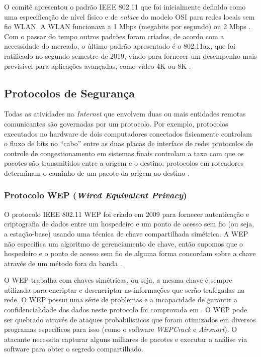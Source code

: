 \documentclass[
	article,			%
	11pt,				%
	oneside,			%
	a4paper,			%
	english,			%
	brazil,				%
	sumario=tradicional
	]{abntex2}
\begin{document}
O comitê apresentou o padrão IEEE 802.11 que foi inicialmente definido como uma especificação de nível físico e de \textit{enlace} do modelo OSI para redes locais sem fio WLAN. A WLAN  funcionava a 1 Mbps (megabits por segundo) ou 2 Mbps \cite{tanenbaum2003redes}. Com o passar do tempo outros padrões foram criados, de acordo com a necessidade do mercado, o último padrão apresentado é o 802.11ax, que foi ratificado no segundo semestre de 2019, vindo para fornecer um desempenho mais previsível para aplicações avançadas, como vídeo 4K ou 8K \cite{lopez2019ieee}. 

\subsection{Protocolos de Segurança}
\label{sec:protocolo}
Todas as atividades na \textit{Internet} que envolvem duas ou mais entidades remotas comunicantes são governadas por um protocolo. Por exemplo, protocolos executados no hardware de dois computadores conectados fisicamente controlam o fluxo de bits no “cabo” entre as duas placas de interface de rede; protocolos de controle de congestionamento em sistemas finais controlam a taxa com que os pacotes são transmitidos entre a origem e o destino; protocolos em roteadores determinam o caminho de um pacote da origem ao destino \cite{kurose2007redes}.


\subsubsection{Protocolo WEP (\textit{Wired Equivalent Privacy})}
O protocolo IEEE 802.11 WEP foi criado em 2009 para fornecer autenticação e criptografia de dados entre um hospedeiro e um ponto de acesso sem fio (ou seja, a estação-base) usando uma técnica de chave compartilhada simétrica. A WEP não especifica um algoritmo de gerenciamento de chave, então supomos que o hospedeiro
e o ponto de acesso sem fio de alguma forma concordam sobre a chave através de um método fora da banda \cite{kurose2007redes}.

O WEP trabalha com chaves simétricas, ou seja, a mesma chave é sempre
utilizada para encriptar e desencriptar as informações que serão trafegadas na rede. O WEP possui uma série de problemas e a incapacidade de garantir a confidencialidade dos dados neste protocolo foi comprovada em \cite{fluhrer2001weaknesses}. O WEP pode ser quebrado através de ataques probabilísticos que foram otimizados em diversos programas específicos para isso (como o software \textit{WEPCrack} e \textit{Airsnort}). O atacante necessita capturar alguns milhares de pacotes e executar a análise via software para obter o segredo compartilhado.
\end{document}
